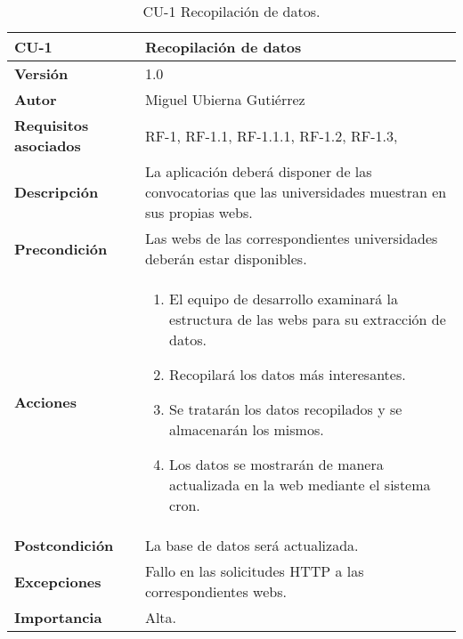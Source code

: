 \begin{table}[p]
	\centering
	\begin{tabularx}{\linewidth}{ p{} p{} }
		\toprule
		\textbf{CU-1}    & \textbf{Recopilación de datos}\\
		\toprule
		\textbf{Versión}              & 1.0    \\
		\textbf{Autor}                & Miguel Ubierna Gutiérrez \\
		\textbf{Requisitos asociados} & RF-1, RF-1.1, RF-1.1.1, RF-1.2, RF-1.3,  \\
		\textbf{Descripción}          & La aplicación deberá disponer de las convocatorias que las universidades muestran en sus propias webs. \\
		\textbf{Precondición}         & Las webs de las correspondientes universidades deberán estar disponibles. \\
		\textbf{Acciones}             &
		\begin{enumerate}
			\def\labelenumi{\arabic{enumi}.}
			\tightlist
			\item El equipo de desarrollo examinará la estructura de las webs para su extracción de datos.
			\item Recopilará los datos más interesantes.
                \item Se tratarán los datos recopilados y se almacenarán los mismos.
                \item Los datos se mostrarán de manera actualizada en la web mediante el sistema cron.
		\end{enumerate}\\
		\textbf{Postcondición}        & La base de datos será actualizada. \\
		\textbf{Excepciones}          & Fallo en las solicitudes HTTP a las correspondientes webs. \\
		\textbf{Importancia}          & Alta. \\
		\bottomrule
	\end{tabularx}
	\caption{CU-1 Recopilación de datos.}
\end{table}


